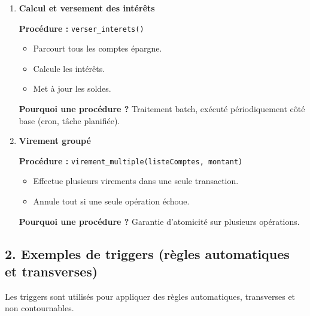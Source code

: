 \documentclass[11pt]{article}
\begin{document}
\begin{enumerate}
\begin{itemize}
    \item Vérifie la compatibilité du type avec le solde actuel.
    \item Empêche certains changements (ex : compte épargne → compte courant).
\end{itemize}

\textbf{Pourquoi une procédure ?}
Règles complexes dépendantes des données existantes.

\item \textbf{Calcul et versement des intérêts}

\textbf{Procédure :} \texttt{verser\_interets()}

\begin{itemize}
    \item Parcourt tous les comptes épargne.
    \item Calcule les intérêts.
    \item Met à jour les soldes.
\end{itemize}

\textbf{Pourquoi une procédure ?}
Traitement batch, exécuté périodiquement côté base (cron, tâche planifiée).

\item \textbf{Virement groupé}

\textbf{Procédure :} \texttt{virement\_multiple(listeComptes, montant)}

\begin{itemize}
    \item Effectue plusieurs virements dans une seule transaction.
    \item Annule tout si une seule opération échoue.
\end{itemize}

\textbf{Pourquoi une procédure ?}
Garantie d’atomicité sur plusieurs opérations.

\end{enumerate}

\subsection*{2. Exemples de triggers (règles automatiques et transverses)}

Les triggers sont utilisés pour appliquer des règles automatiques, transverses et non contournables.
\end{document}
